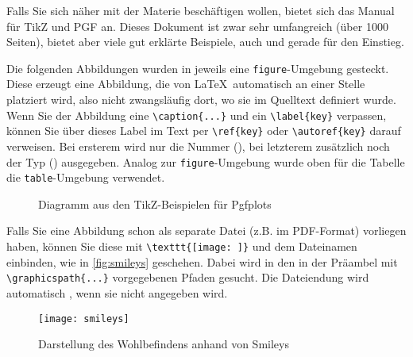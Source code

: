 Falls Sie sich näher mit der Materie beschäftigen wollen, bietet sich das Manual für TikZ und PGF\cite{pgfmanual} an. Dieses Dokument ist zwar sehr umfangreich (über 1000 Seiten), bietet aber viele gut erklärte Beispiele, auch und gerade für den Einstieg.

Die folgenden Abbildungen wurden in jeweils eine \verb|figure|-Umgebung gesteckt. Diese erzeugt eine  Abbildung, die von \LaTeX\ automatisch an einer  Stelle platziert wird, also nicht zwangsläufig dort, wo sie im Quelltext definiert wurde. Wenn Sie der Abbildung eine \verb|\caption{...}| und ein \verb|\label{key}| verpassen, können Sie über dieses Label im Text per \verb|\ref{key}| oder \verb|\autoref{key}| darauf verweisen. Bei ersterem wird nur die Nummer (\qq{\ref{fig:diagramm}}), bei letzterem zusätzlich noch der Typ () ausgegeben. Analog zur \verb|figure|-Umgebung wurde oben für die Tabelle die \verb|table|-Umgebung verwendet.
\begin{figure}[htb]
\centering
{}
\caption{Diagramm aus den TikZ-Beispielen für Pgfplots\label{fig:diagramm}}
\end{figure}

Falls Sie eine Abbildung schon als separate Datei (z.B. im PDF-Format) vorliegen haben, können Sie diese mit \verb|\texttt{[image: ]}| und dem Dateinamen einbinden, wie in \autoref{fig:smileys} geschehen. Dabei wird in den in der Präambel mit \verb|\graphicspath{...}| vorgegebenen Pfaden gesucht. Die Dateiendung wird automatisch , wenn sie nicht angegeben wird.
\begin{figure}[htb]
	\centering
	\texttt{[image: smileys]}
	\caption{Darstellung des Wohlbefindens anhand von Smileys\label{fig:smileys}}
\end{figure}
